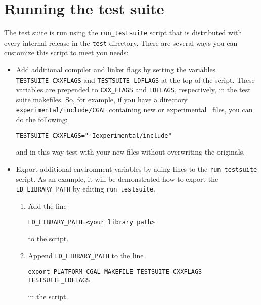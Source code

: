 \section{Running the test suite\label{sec:running_test_suite}}

The test suite is run using the {\tt run\_testsuite} script that is distributed
with every internal release in the {\tt test} directory.  There are several
ways you can customize this script to meet you needs:

\begin{itemize}
\item Add additional compiler and linker flags by setting the variables
      {\tt TESTSUITE\_CXXFLAGS}%
      and {\tt TESTSUITE\_LDFLAGS} 
      at the top of the
      script.  These variables are prepended to {\tt CXX\_FLAGS} and
      {\tt LDFLAGS}, respectively, in the test suite makefiles.  So, for
      example, if you have a directory \verb|experimental/include/CGAL| 
      containing new or experimental \cgal\ files,  you can do the following:
      \begin{center}
      \verb|TESTSUITE_CXXFLAGS="-Iexperimental/include"|
      \end{center}
      and in this way test with your new files without overwriting
      the originals.
 
\item Export additional environment variables by ading lines to the 
      {\tt run\_testsuite} script. As an example, it will be demonstrated 
      how to export the {\tt LD\_LIBRARY\_PATH} by editing \texttt{run\_testsuite}.%
      \begin{enumerate}
      \item Add the line
            \begin{center}
               \verb|LD_LIBRARY_PATH=<your library path>|
            \end{center}
            to the script.
      \item Append {\tt LD\_LIBRARY\_PATH} to the line
            \begin{center}
            \verb|export PLATFORM CGAL_MAKEFILE TESTSUITE_CXXFLAGS TESTSUITE_LDFLAGS|
            \end{center}
            in the script.
      \end{enumerate}


\end{itemize}

